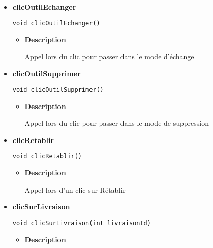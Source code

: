 \documentclass[11pt,a4paper]{report}
\begin{document}
{{{{\begin{itemize}
{\begin{itemize}
{Appel lors du clic pour passer dans le mode d'ajout
}
\end{itemize}
}%
\item{ 
\hypertarget{controleur.ControleurInterface.clicOutilEchanger()}{{\bf  clicOutilEchanger}\\}
\begin{lstlisting}[frame=none]
void clicOutilEchanger()\end{lstlisting} %
\begin{itemize}
\item{
{\bf  Description}

Appel lors du clic pour passer dans le mode d'échange
}
\end{itemize}
}%
\item{ 
\hypertarget{controleur.ControleurInterface.clicOutilSupprimer()}{{\bf  clicOutilSupprimer}\\}
\begin{lstlisting}[frame=none]
void clicOutilSupprimer()\end{lstlisting} %
\begin{itemize}
\item{
{\bf  Description}

Appel lors du clic pour passer dans le mode de suppression
}
\end{itemize}
}%
\item{ 
\hypertarget{controleur.ControleurInterface.clicRetablir()}{{\bf  clicRetablir}\\}
\begin{lstlisting}[frame=none]
void clicRetablir()\end{lstlisting} %
\begin{itemize}
\item{
{\bf  Description}

Appel lors d'un clic sur Rétablir
}
\end{itemize}
}%
\item{ 
\hypertarget{controleur.ControleurInterface.clicSurLivraison(int)}{{\bf  clicSurLivraison}\\}
\begin{lstlisting}[frame=none]
void clicSurLivraison(int livraisonId)\end{lstlisting} %
\begin{itemize}
\item{
{\bf  Description}

}
\end{itemize}}
\end{itemize}}}}}
\end{document}
